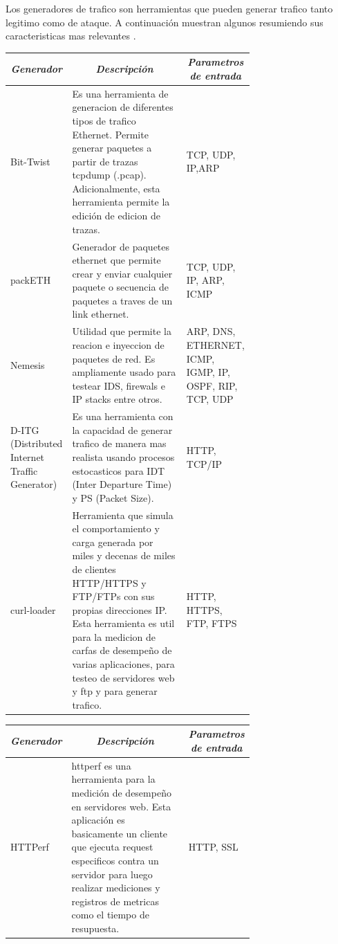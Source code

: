 \documentclass[12pt]{article}
\begin{document}
Los generadores de trafico son herramientas que pueden generar trafico tanto legitimo como de ataque. A continuación muestran algunos resumiendo sus caracteristicas mas relevantes \citep{dos_tools}. 

\begin{table}[htbp]
\centering
\begin{tabular}{|p{0.1\linewidth}|p{0.5\linewidth}|p{0.1\linewidth}|}
\hline
\multicolumn{1}{|c|}{\textit{\textbf{Generador}}} & \multicolumn{1}{c|}{\textit{\textbf{Descripción}}} & \multicolumn{1}{c|}{\textit{\textbf{Parametros de entrada}}} \tabularnewline \hline
Bit-Twist & Es una herramienta de generacion de diferentes tipos de trafico Ethernet. Permite generar paquetes a partir de trazas tcpdump (.pcap). Adicionalmente, esta herramienta permite la edición de edicion de trazas.  
 & TCP, UDP, IP,ARP \tabularnewline \hline
packETH & Generador de paquetes ethernet que permite crear y enviar cualquier paquete o secuencia de paquetes a traves de un link ethernet.  
 & TCP, UDP, IP, ARP, ICMP \tabularnewline \hline
Nemesis & Utilidad que permite la reacion e inyeccion de paquetes de red. Es ampliamente usado para testear IDS, firewals e IP stacks entre otros.  
 & ARP, DNS, ETHERNET, ICMP, IGMP, IP, OSPF, RIP, TCP, UDP \tabularnewline \hline
D-ITG (Distributed Internet Traffic Generator) & Es una herramienta con la capacidad de generar trafico de manera mas realista usando procesos estocasticos para IDT (Inter Departure Time) y PS (Packet Size).  
 & HTTP, TCP/IP \tabularnewline \hline
curl-loader & Herramienta que simula el comportamiento y carga generada  por miles y decenas de miles de clientes HTTP/HTTPS y FTP/FTPs con sus propias direcciones IP. Esta herramienta es util para la medicion de carfas de desempeño de varias aplicaciones, para testeo de servidores web y ftp y para generar trafico. & HTTP, HTTPS, FTP, FTPS\tabularnewline \hline

\end{tabular}
\end{table}


\begin{table}[htbp]
\centering
\begin{tabular}{|p{0.1\linewidth}|p{0.5\linewidth}|p{0.1\linewidth}|}
\hline
\multicolumn{1}{|c|}{\textit{\textbf{Generador}}} & \multicolumn{1}{c|}{\textit{\textbf{Descripción}}} & \multicolumn{1}{c|}{\textit{\textbf{Parametros de entrada}}} \tabularnewline \hline
HTTPerf & httperf es una herramienta para la medición de desempeño en servidores web. Esta aplicación es basicamente un cliente que ejecuta request especificos contra un servidor para luego realizar mediciones y registros de metricas como el tiempo de resupuesta. & HTTP, SSL \tabularnewline \hline
\end{tabular}
\end{table}
\end{document}
